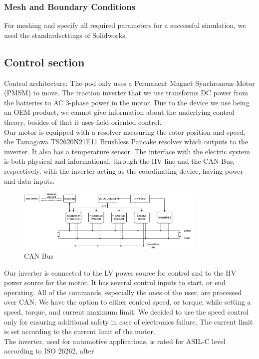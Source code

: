 \subsubsection{Mesh and Boundary Conditions}
For meshing and specify all required parameters for a successful simulation, we used the standardsettings of Solidworks.

\subsection{Control section}
Control architecture: The pod only uses a Permanent Magnet Synchronous Motor (PMSM) to move. The traction inverter that we use transforms DC power from the batteries to AC 3-phase power in the motor. Due to the device we use being an OEM product, we cannot give information about the underlying control theory, besides of that it uses field-oriented control. \\
Our motor is equipped with a resolver measuring the rotor position and speed, the Tamagawa TS2620N21E11 Brushless Pancake resolver which outputs to the inverter. It also has a temperature sensor.
The interface with the electric system is both physical and informational, through the HV line and the CAN Bus, respectively, with the inverter acting as the coordinating device, having power and data inputs. 
\begin{figure}[H]
  \centering
  \includegraphics[width=0.8\textwidth]{texfiles/mech/eimg/propulsion/telemetrysystems}
  \caption{CAN Bus}
  \label{fig:canbus}
\end{figure}
Our inverter is connected to the LV power source for control and to the HV power source for the motor. It has 
several control inputs to start, or end operating.
All of the commands, especially the ones of the user, are processed over CAN. We have the option to either 
control speed, or torque, while setting a speed, torque, and current maximum limit. We decided to use the speed control only for ensuring additional safety in case of electronics failure. The current limit is set according to the current limit of the motor. \\
The inverter, used for automotive applications, is rated for ASIL-C level according to ISO 26262, after
